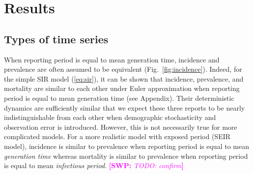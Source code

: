 \documentclass{article}
\newcommand{\eref}[1]{(\ref{eq:#1})}
\newcommand{\fref}[1]{Fig.~\ref{fig:#1}}
\newcommand{\comment}[3]{\textcolor{#1}{\textbf{[#2: }\textsl{#3}\textbf{]}}}
\newcommand{\swp}[1]{\comment{magenta}{SWP}{#1}}
\begin{document}
\section{Results}

\subsection{Types of time series}

When reporting period is equal to mean generation time, incidence and prevalence are often assumed to be equivalent (\fref{incidence}).
Indeed, for the simple SIR model \eref{sir}, it can be shown that incidence, prevalence, and mortality are similar to each other under Euler approximation when reporting period is equal to mean generation time (see Appendix).
Their deterministic dynamics are sufficiently similar that we expect these three reports to be nearly indistinguishable from each other when demographic stochasticity and observation error is introduced.
However, this is not necessarily true for more complicated models.
For a more realistic model with exposed period (SEIR model), incidence is similar to prevalence when reporting period is equal to mean \emph{generation time} whereas mortality is similar to prevalence when reporting period is equal to mean \emph{infectious period}. \swp{TODO: confirm}
\end{document}
